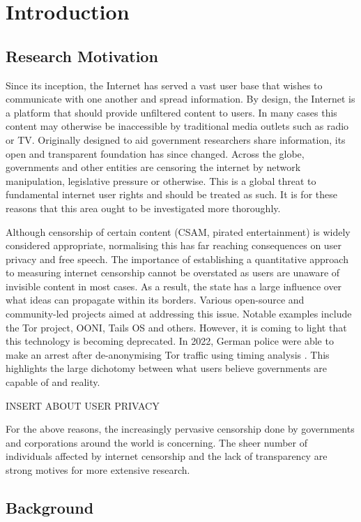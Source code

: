 \chapter{Introduction}

\section{Research Motivation}

Since its inception, the Internet has served a vast user base that wishes to communicate with one another and spread information. By design, the Internet is a platform that should provide unfiltered content to users. In many cases this content may otherwise be inaccessible by traditional media outlets such as radio or TV. Originally designed to aid government researchers share information, its open and transparent foundation has since changed. Across the globe, governments and other entities are censoring the internet by network manipulation, legislative pressure or otherwise. This is a global threat to fundamental internet user rights and should be treated as such. It is for these reasons that this area ought to be investigated more thoroughly.

Although censorship of certain content (CSAM, pirated entertainment) is widely considered appropriate, normalising this has far reaching consequences on user privacy and free speech. The importance of establishing a quantitative approach to measuring internet censorship cannot be overstated as users are unaware of invisible content in most cases. As a result, the state has a large influence over what ideas can propagate within its borders. Various open-source and community-led projects aimed at addressing this issue. Notable examples include the Tor project, OONI, Tails OS and others. However, it is coming to light that this technology is becoming deprecated. In 2022, German police were able to make an arrest after de-anonymising Tor traffic using timing analysis \cite{TorDeanonymization}. This highlights the large dichotomy between what users believe governments are capable of and reality. 

INSERT ABOUT USER PRIVACY

For the above reasons, the increasingly pervasive censorship done by governments and corporations around the world is concerning. The sheer number of individuals affected by internet censorship and the lack of transparency are strong motives for more extensive research.

\section{Background}

